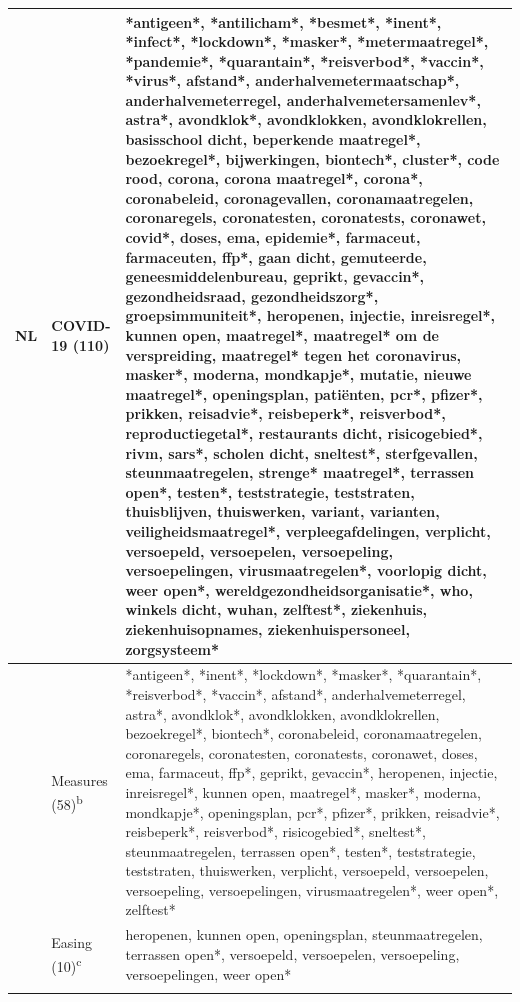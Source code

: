 \documentclass[
]{ccr}
\begin{document}
{\begin{spacing}{.9}
\begin{longtable}[]{@{}
  >{\raggedright\arraybackslash}p{.09\linewidth}
  >{\raggedright\arraybackslash}p{.12\linewidth}
  >{\raggedright\arraybackslash}p{.71\linewidth}@{}}
NL & COVID-19 (110) & *antigeen*, *antilicham*, *besmet*, *inent*,
*infect*, *lockdown*, *masker*, *metermaatregel*, *pandemie*,
*quarantain*, *reisverbod*, *vaccin*, *virus*, afstand*,
anderhalvemetermaatschap*, anderhalvemeterregel,
anderhalvemetersamenlev*, astra*, avondklok*, avondklokken,
avondklokrellen, basisschool dicht, beperkende maatregel*, bezoekregel*,
bijwerkingen, biontech*, cluster*, code rood, corona, corona maatregel*,
corona*, coronabeleid, coronagevallen, coronamaatregelen, coronaregels,
coronatesten, coronatests, coronawet, covid*, doses, ema, epidemie*,
farmaceut, farmaceuten, ffp*, gaan dicht, gemuteerde,
geneesmiddelenbureau, geprikt, gevaccin*, gezondheidsraad,
gezondheidszorg*, groepsimmuniteit*, heropenen, injectie, inreisregel*,
kunnen open, maatregel*, maatregel* om de verspreiding, maatregel* tegen
het coronavirus, masker*, moderna, mondkapje*, mutatie, nieuwe
maatregel*, openingsplan, patiënten, pcr*, pfizer*, prikken, reisadvie*,
reisbeperk*, reisverbod*, reproductiegetal*, restaurants dicht,
risicogebied*, rivm, sars*, scholen dicht, sneltest*, sterfgevallen,
steunmaatregelen, strenge* maatregel*, terrassen open*, testen*,
teststrategie, teststraten, thuisblijven, thuiswerken, variant,
varianten, veiligheidsmaatregel*, verpleegafdelingen, verplicht,
versoepeld, versoepelen, versoepeling, versoepelingen,
virusmaatregelen*, voorlopig dicht, weer open*,
wereldgezondheidsorganisatie*, who, winkels dicht, wuhan, zelftest*,
ziekenhuis, ziekenhuisopnames, ziekenhuispersoneel, zorgsysteem* \\ \cline{2-3}

& Measures (58)\textsuperscript{b} & *antigeen*, *inent*, *lockdown*,
*masker*, *quarantain*, *reisverbod*, *vaccin*, afstand*,
anderhalvemeterregel, astra*, avondklok*, avondklokken, avondklokrellen,
bezoekregel*, biontech*, coronabeleid, coronamaatregelen, coronaregels,
coronatesten, coronatests, coronawet, doses, ema, farmaceut, ffp*,
geprikt, gevaccin*, heropenen, injectie, inreisregel*, kunnen open,
maatregel*, masker*, moderna, mondkapje*, openingsplan, pcr*, pfizer*,
prikken, reisadvie*, reisbeperk*, reisverbod*, risicogebied*, sneltest*,
steunmaatregelen, terrassen open*, testen*, teststrategie, teststraten,
thuiswerken, verplicht, versoepeld, versoepelen, versoepeling,
versoepelingen, virusmaatregelen*, weer open*, zelftest* \\ \cline{2-3}
 
& Easing (10)\textsuperscript{c} & heropenen, kunnen open,
openingsplan, steunmaatregelen, terrassen open*, versoepeld,
versoepelen, versoepeling, versoepelingen, weer open* \\ \cline{2-3}


\end{longtable}
\end{spacing}}
\end{document}
